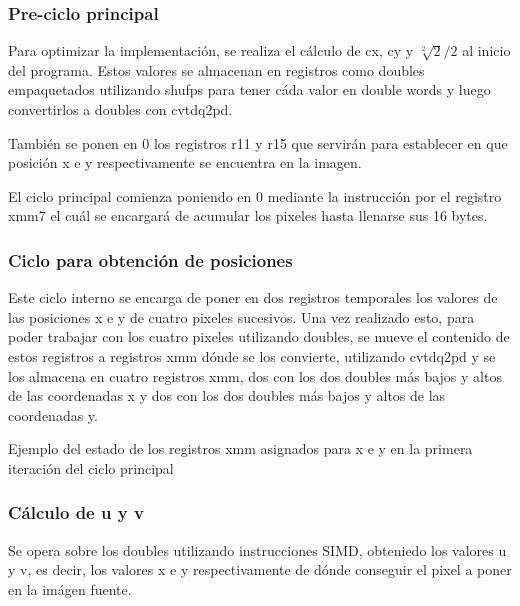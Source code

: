 \subsubsection{Pre-ciclo principal}
Para optimizar la implementación, se realiza el cálculo de cx, cy y $\sqrt[2]{2}/2$ al inicio del programa. Estos valores se almacenan en registros como doubles empaquetados utilizando shufps para tener cáda valor en double words y luego convertirlos a doubles con cvtdq2pd.

También se ponen en 0 los registros r11 y r15 que servirán para establecer en que posición x e y respectivamente se encuentra en la imagen.

El ciclo principal comienza poniendo en 0 mediante la instrucción por el registro xmm7 el cuál se encargará de acumular los pixeles hasta llenarse sus 16 bytes.

\subsubsection{Ciclo para obtención de posiciones}
Este ciclo interno se encarga de poner en dos registros temporales los valores de las posiciones x e y de cuatro pixeles sucesivos. Una vez realizado esto, para poder trabajar con los cuatro pixeles utilizando doubles, se mueve el contenido de estos registros a registros xmm dónde se los convierte, utilizando cvtdq2pd y se los almacena en cuatro registros xmm, dos con los dos doubles más bajos y altos de las coordenadas x y dos con los dos doubles más bajos y altos de las coordenadas y.

\begin{center}
\end{center}
Ejemplo del estado de los registros xmm asignados para x e y en la primera iteración del ciclo principal

\subsubsection{Cálculo de u y v}
Se opera sobre los doubles utilizando instrucciones SIMD, obteniedo los valores u y v, es decir, los valores x e y respectivamente de dónde conseguir el pixel a poner en la imágen fuente.

